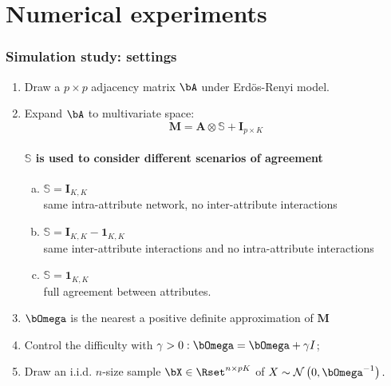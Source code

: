 \documentclass[10pt, c, xcolor=x11names]{beamer}\usepackage[]{graphicx}\usepackage[]{color}
\newcommand{\invcov}{\bOmega}
\begin{document}



\section{Numerical experiments}

\begin{frame}
  \frametitle{Simulation study: settings}

  \begin{enumerate}
\item  Draw a $p \times p$ adjacency matrix $\bA$ under Erd\"os-Renyi model.
\item  Expand $\bA$  to  multivariate space:
  $$\mathbf{M} = \mathbf{A}  \otimes \mathbb{S} + \mathbf{I}_{p\times K}$$
  \paragraph{$\mathbb{S}$ is used to consider different scenarios of agreement}
  \begin{enumerate}[a)]
  \item $\mathbb{S} = \mathbf{I}_{K,K}$ \\
    \rsa same intra-attribute network, no inter-attribute interactions
  \item $\mathbb{S} = \mathbf{I}_{K,K} - \mathbf{1}_{K,K}$ \\
  \rsa same inter-attribute interactions and no intra-attribute interactions
  \item $\mathbb{S} = \mathbf{1}_{K,K}$ \\
    \rsa full agreement between  attributes.
  \end{enumerate}
\item $\invcov$ is the nearest a positive definite approximation of $\mathbf{M}$
\item Control the difficulty with $\gamma>0: \invcov= \invcov+ \gamma I$;
\item Draw an i.i.d. $n$-size sample $\bX\in\Rset^{n\times pK}$ of
  $X \sim \mathcal{N} \left( 0,\invcov^{-1} \right) .$
\end{enumerate}


\end{frame}
\end{document}
